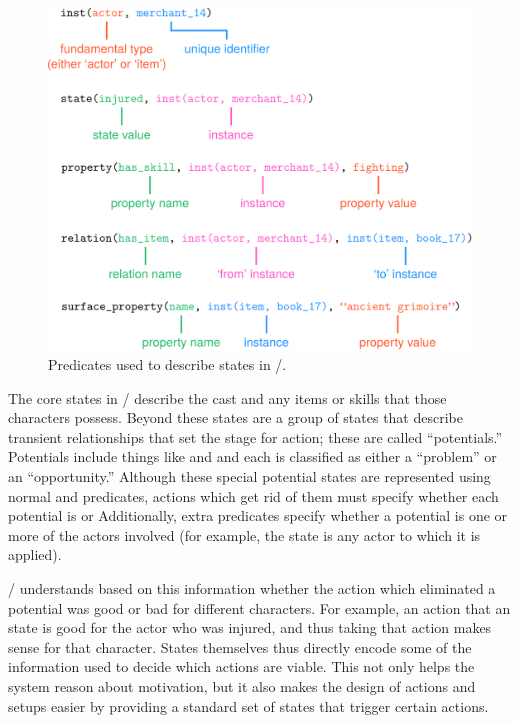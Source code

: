 \begin{figure}[!t]
\includegraphics[width=\textwidth]{fig/cropped-dunyazad-states.pdf}
\caption[\dunyazad/'s state predicates]{Predicates used to describe states in \dunyazad/.}
\label{fig:dunyazad-states}
\end{figure}


The core states in \dunyazad/ describe the cast and any items or skills that those characters possess.
%
Beyond these states are a group of states that describe transient relationships that set the stage for action; these are called ``potentials.''
%
Potentials include things like   and  and each is classified as either a ``problem'' or an ``opportunity.''
%
Although these special potential states are represented using normal   and  predicates, actions which get rid of them must specify whether each potential is   or 
%
Additionally, extra predicates specify whether a potential is  one or more of the actors involved (for example, the  state is  any actor to which it is applied).


\dunyazad/ understands based on this information whether the action which eliminated a potential was good or bad for different characters.
%
For example, an action that  an  state is good for the actor who was injured, and thus taking that action makes sense for that character.
%
States themselves thus directly encode some of the information used to decide which actions are viable.
%
This not only helps the system reason about motivation, but it also makes the design of actions and setups easier by providing a standard set of states that trigger certain actions.


